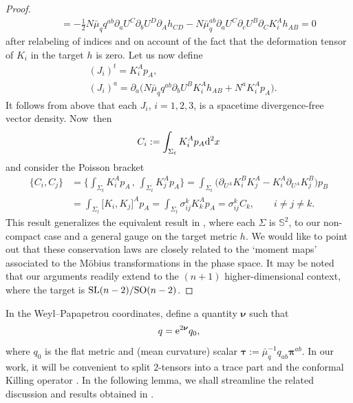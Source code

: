 \documentclass[11pt]{article}
\numberwithin{equation}{section}
\def\ptl{\partial}%
\def\mbo#1{\boldsymbol{#1}}%
\def\halb{\frac{1}{2}}%
\numberwithin{equation}{section}
\begin{document}
\begin{proof}
\begin{gather*}
\qquad{}= -\halb N \bar{\mu}_q q^{ab} \ptl_a U^C \ptl_b U^D \ptl_A h_{CD}- N \bar{\mu}_q^{ab} \ptl_a U^C \ptl_c U^B \ptl_C K_i^A h_{AB} = 0
\end{gather*}
after relabeling of indices and on account of the fact that the deformation tensor of $K_i$ in the target $h$ is zero. Let us now define
\begin{align*}
&(J_i)^t = K^A_i p_A,\\
&(J_i)^a = \ptl_a \bigl(N \bar{\mu}_q q^{ab} \ptl_b U^B K_i^A h_{AB} + N^a K_i^A p_A\bigr).
\end{align*}
It follows from above that each $J_i$, $i = 1, 2, 3$, is a spacetime divergence-free vector density. Now~then
\begin{align*}
C_i := \int_{\Sigma_t}K_i^A p_A {\rm d}^2 x
\end{align*}
and consider the Poisson bracket
\begin{align*}
\{ C_i, C_j \} &{}= \biggl\{ \int_{\Sigma_t} K^A_i p_A \,,\, \int_{\Sigma_t} K^A_j p_A \biggr\}
= \int_{\Sigma_t} \bigl(\ptl_{U^A} K^B_i K^A_j - K^A_i \ptl_{U^A} K^B_j \bigr) p_B \\
&{}= \int_{\Sigma_t} \bigl[K_i, K_j \bigr]^A p_A = \int_{\Sigma_t} \sigma^k_{ij} K^A_k p_A
= \sigma^k_{ij} C_k, \qquad i \neq j \neq k.
\end{align*}
This result generalizes the equivalent result in \cite{kaluz1}, where each $\Sigma$ is $\mathbb{S}^2$, to our non-compact case and a general gauge on the target metric $h$. We would like to point out that these conservation laws are closely related to the `moment maps' associated to the M\"obius transformations in the phase space. It may be noted that our arguments readily extend to the $(n+1)$ higher-dimensional context, where the target is ${\rm SL}(n-2)/{\rm SO}(n-2)$.
\end{proof}

In the Weyl--Papapetrou coordinates, define a quantity $\mbo{\nu}$ such that
\begin{align} \label{conformal}
q= {\rm e}^{2\mbo{\nu}} q_0,
\end{align}
where $q_0$ is the flat metric and (mean curvature) scalar $\mbo{\tau} := \bar{\mu}^{-1}_q q_{ab} \mbo{\pi}^{ab}$. In our work, it will be convenient to split $2$-tensors into a trace part and the conformal Killing operator \cite{kaluz1}. In the following lemma, we shall streamline the related discussion and results obtained in \cite{kaluz1}.
\end{document}
